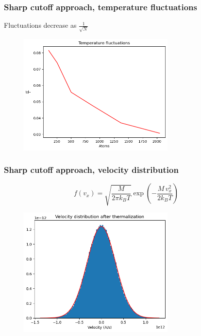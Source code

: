 \documentclass{beamer}
\begin{document}
\begin{frame}
    \frametitle{Sharp cutoff approach, temperature fluctuations}

    \centering Fluctuations decrease as $\frac{1}{\sqrt{N}}$

    \begin{figure}
        \includegraphics[width=0.7\textwidth]{images/tempfluct.png}
    \end{figure}

\end{frame}

\begin{frame}
    \frametitle{Sharp cutoff approach, velocity distribution}

    $$f(v_x)=\sqrt{\frac{M}{{2\pi k_B T}}} \exp {\left(-\frac{M\, v_x^2}{2 k_B T}\right)}$$

    \begin{figure}
        \includegraphics[width=0.7\textwidth]{images/distvelocity1.png}
    \end{figure}

\end{frame}
\end{document}

